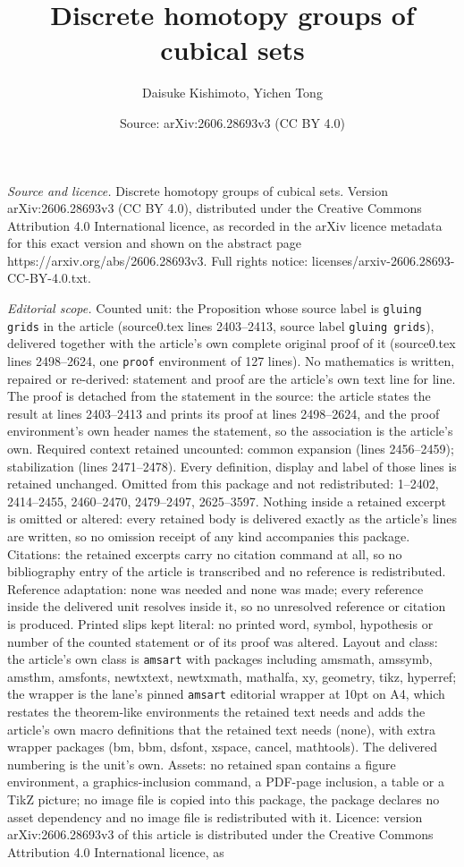 \documentclass[10pt,a4paper]{amsart}
\title[Discrete homotopy groups of cubical sets]{Discrete homotopy groups of cubical sets}
\author{Daisuke Kishimoto, Yichen Tong}
\date{Source: arXiv:2606.28693v3 (CC BY 4.0)}
\begin{document}
\maketitle

\noindent\emph{Source and licence.} Discrete homotopy groups of cubical sets. Version arXiv:2606.28693v3 (CC BY 4.0), distributed under the Creative Commons Attribution 4.0 International licence, as recorded in the arXiv licence metadata for this exact version and shown on the abstract page https://arxiv.org/abs/2606.28693v3. Full rights notice: licenses/arxiv-2606.28693-CC-BY-4.0.txt.\par\smallskip

\noindent\textit{Editorial scope.} Counted unit: the Proposition whose source label is \texttt{gluing grids} in the article (source0.tex lines 2403--2413, source label \texttt{gluing grids}), delivered together with the article's own complete original proof of it (source0.tex lines 2498--2624, one \texttt{proof} environment of 127 lines). No mathematics is written, repaired or re-derived: statement and proof are the article's own text line for line. The proof is detached from the statement in the source: the article states the result at lines 2403--2413 and prints its proof at lines 2498--2624, and the proof environment's own header names the statement, so the association is the article's own. Required context retained uncounted: common expansion (lines 2456--2459); stabilization (lines 2471--2478). Every definition, display and label of those lines is retained unchanged. Omitted from this package and not redistributed: 1--2402, 2414--2455, 2460--2470, 2479--2497, 2625--3597. Nothing inside a retained excerpt is omitted or altered: every retained body is delivered exactly as the article's lines are written, so no omission receipt of any kind accompanies this package. Citations: the retained excerpts carry no citation command at all, so no bibliography entry of the article is transcribed and no reference is redistributed. Reference adaptation: none was needed and none was made; every reference inside the delivered unit resolves inside it, so no unresolved reference or citation is produced. Printed slips kept literal: no printed word, symbol, hypothesis or number of the counted statement or of its proof was altered. Layout and class: the article's own class is \texttt{amsart} with packages including amsmath, amssymb, amsthm, amsfonts, newtxtext, newtxmath, mathalfa, xy, geometry, tikz, hyperref; the wrapper is the lane's pinned \texttt{amsart} editorial wrapper at 10pt on A4, which restates the theorem-like environments the retained text needs and adds the article's own macro definitions that the retained text needs (none), with extra wrapper packages (bm, bbm, dsfont, xspace, cancel, mathtools). The delivered numbering is the unit's own. Assets: no retained span contains a figure environment, a graphics-inclusion command, a PDF-page inclusion, a table or a TikZ picture; no image file is copied into this package, the package declares no asset dependency and no image file is redistributed with it. Licence: version arXiv:2606.28693v3 of this article is distributed under the Creative Commons Attribution 4.0 International licence, as 
\end{document}
